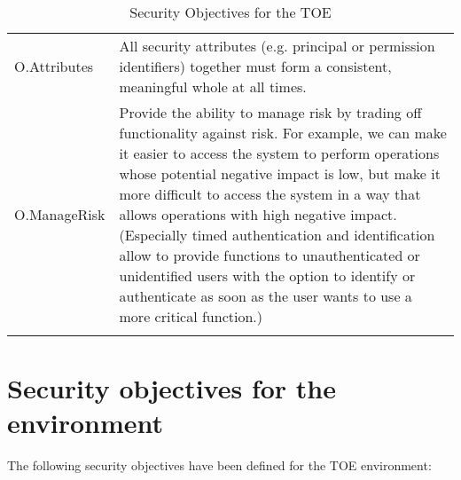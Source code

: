 \documentclass[12pt,english]{scrbook}
\begin{document}
\begin{longtable}[c]{lp{10cm}}
  O.Attributes &  All security attributes (e.g. principal or permission
    identifiers) together must form a consistent, meaningful whole at all
    times. \\

  O.ManageRisk
   & 
  Provide the ability to manage risk by trading off functionality against risk.
  For example, we can make it easier to access the system to perform operations
  whose potential negative impact is low, but make it more difficult to access
  the system in a way that allows operations with high negative impact.
  (Especially timed authentication and identification allow to provide
  functions to unauthenticated or unidentified users with the option to
  identify or authenticate as soon as the user wants to use a more critical
  function.)
  \\
  \bottomrule
  \caption{Security Objectives for the TOE}
\end{longtable}





\section{Security objectives for the environment}

The following security objectives have been defined for the TOE environment:
\end{document}
